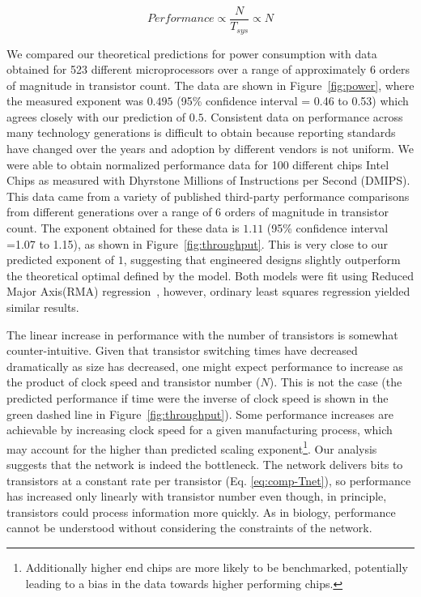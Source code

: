 \documentclass[12pt]{article}
\begin{document}
\begin{equation}
\label{eq:Performance}
Performance\propto \frac{N}{T_{sys}} \propto N
\end{equation}

We compared our theoretical predictions for power consumption with data obtained for 523
different microprocessors over a range of approximately 6 orders of magnitude
in transistor count.  The data are shown in Figure~\ref{fig:power}, where the
measured exponent was $0.495$ (95\% confidence interval = 0.46 to 0.53) which agrees closely with our prediction of
$0.5$. Consistent data on performance across many technology generations is
difficult to obtain because reporting standards have changed over the years and 
adoption by different vendors is not uniform.  We were able to obtain
normalized performance data for 100 different chips Intel Chips as measured
with Dhyrstone Millions of Instructions per Second (DMIPS). This data came from
a variety of published third-party performance comparisons from different
generations over a range of 6 orders of magnitude in transistor count.  The
exponent obtained for these data is $1.11$ (95\% confidence interval =1.07 to 1.15), as shown in
Figure~\ref{fig:throughput}. This is very close to our predicted exponent of
$1$, suggesting that engineered designs slightly outperform the
theoretical optimal defined by the model. Both models were fit using Reduced
Major Axis(RMA) regression~\cite{mcardle1988structural}, however, ordinary
least squares regression yielded similar results. 

The linear increase in performance with the number of transistors is somewhat
counter-intuitive. Given that transistor switching times have decreased
dramatically as size has decreased, one might expect performance to increase as
the product of clock speed and transistor number ($N$). This is not the case (the
predicted performance if time were the inverse of clock speed is shown in the
green dashed line in Figure~\ref{fig:throughput}). Some performance increases
are achievable by increasing clock speed for a given manufacturing process,
which may account for the higher than predicted scaling
exponent\footnote{Additionally higher end chips are more likely to be
  benchmarked, potentially leading to a bias in the data towards higher
performing chips.}. Our analysis suggests that the network is indeed
the bottleneck. The network delivers bits to transistors at a constant rate per transistor
(Eq. \ref{eq:comp-Tnet}), so performance has increased only linearly with transistor
number even though, in principle, transistors could process information more
quickly.  As in biology, performance cannot be
understood without considering the constraints of the network.
\end{document}
